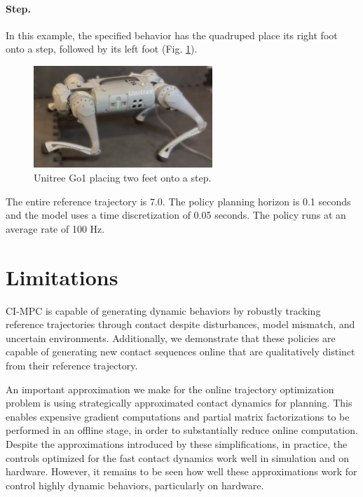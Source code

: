 \paragraph{Step.}
In this example, the specified behavior has the quadruped place its right foot onto a step, followed by its left foot (Fig. \ref{cipc_quadruped_hardware_step}). 

\begin{figure}[H]
	\centering
	\includegraphics[height=3.85cm]{ci_pc/cipc_quadruped_step_blur.png}
	\caption[Unitree Go1 placing two feet onto a step]{Unitree Go1 placing two feet onto a step.}
	\label{cipc_quadruped_hardware_step}
\end{figure}
The entire reference trajectory is 7.0. The policy planning horizon is 0.1 seconds and the model uses a time discretization of 0.05 seconds. The policy runs at an average rate of 100 Hz. 

\section{Limitations} \label{cipc_limitations}
CI-MPC is capable of generating dynamic behaviors by robustly tracking reference trajectories through contact despite disturbances, model mismatch, and uncertain environments. Additionally, we demonstrate that these policies are capable of generating new contact sequences online that are qualitatively distinct from their reference trajectory. 

An important approximation we make for the online trajectory optimization problem is using strategically approximated contact dynamics for planning. This enables expensive gradient computations and partial matrix factorizations to be performed in an offline stage, in order to substantially reduce online computation. Despite the approximations introduced by these simplifications, in practice, the controls optimized for the fast contact dynamics work well in simulation and on hardware. However, it remains to be seen how well these approximations work for control highly dynamic behaviors, particularly on hardware.


